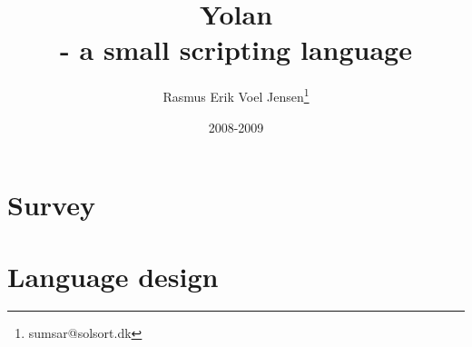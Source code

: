 \documentclass[12pt]{report}
\title{Yolan \\ - a small scripting language}
\author{
  Rasmus Erik Voel Jensen\footnote{
    sumsar@solsort.dk
  }
}
\date{2008-2009}
\begin{document}


\nocite{sicp}

\chapter{Survey}

\chapter{Language design}



\end{document}
